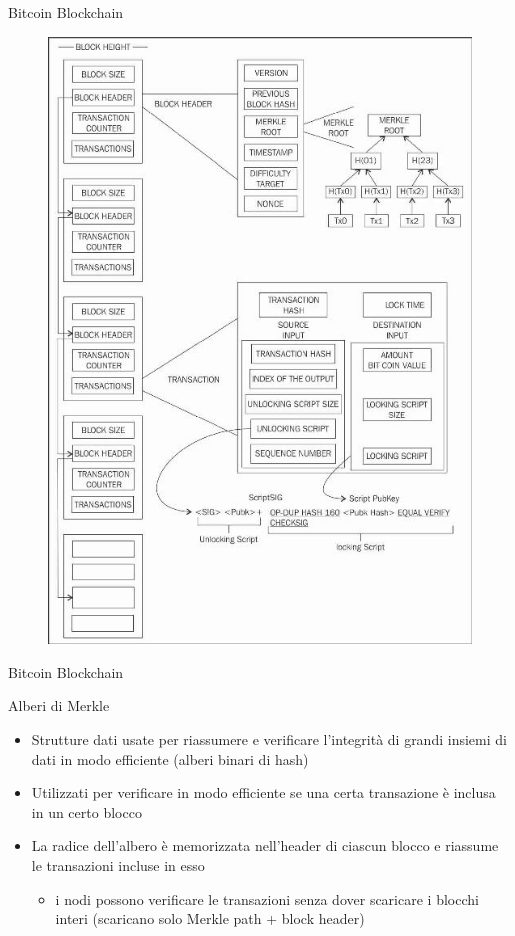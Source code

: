 \documentclass{beamer}
\begin{document}
  
  
  \begin{frame}{Bitcoin Blockchain}
    \begin{figure}[!htb]
    \centering
    \includegraphics[width=0.45\linewidth]{../img/bitcoin-blockchain-scheme.png}
    \end{figure}
  \end{frame}
  
  
  
  \begin{frame}{Bitcoin Blockchain}
      \begin{block}{Alberi di Merkle}
          \begin{itemize}
              \item Strutture dati usate per riassumere e verificare l'integrità di grandi insiemi di dati in modo efficiente (alberi binari di hash)
              \item Utilizzati per verificare in modo efficiente se una certa transazione è inclusa in un certo blocco
              \item La radice dell'albero è memorizzata nell'header di ciascun blocco e riassume le transazioni incluse in esso
              \begin{itemize}
                  \item [\MVRightarrow] i nodi possono verificare le transazioni senza dover scaricare i blocchi interi (scaricano solo Merkle path + block header)
              \end{itemize} 
          \end{itemize}
      \end{block}
  \end{frame}
  
  
  
\end{document}

